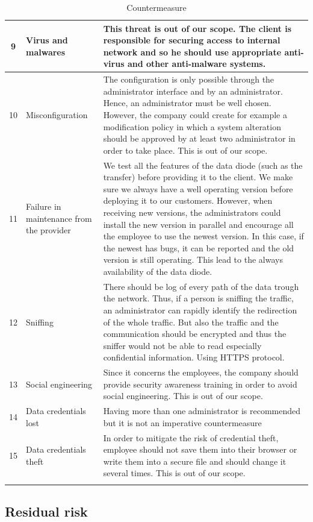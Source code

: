\documentclass[a4paper,10pt]{article}
\begin{document}
\begin{longtable}{|c|p{2.5cm}|p{12cm}|}
\hline
9 & Virus and malwares & This threat is out of our scope. The client is responsible for securing access to internal network and so he should use appropriate anti-virus and other anti-malware systems.  \\
\hline
10 & Misconfiguration & The configuration is only possible through the administrator interface and by an administrator. Hence, an administrator must be well chosen. However, the company could create for example a modification policy in which a system alteration should be approved by at least two administrator in order to take place. This is out of our scope.  \\
\hline
11 & Failure in maintenance from the provider & We test all the features of the data diode (such as the transfer) before providing it to the client. We make sure we always have a well operating version before deploying it to our customers. However, when receiving new versions, the administrators could install the new version in parallel and encourage all the employee to use the newest version. In this case, if the newest has bugs, it can be reported and the old version is still operating. This lead to the always availability of the data diode. \\
\hline
12 & Sniffing & There should be log of every path of the data trough the network. Thus, if a person is sniffing the traffic, an administrator can rapidly identify the redirection of the whole traffic. But also the traffic and the communication should be encrypted and thus the sniffer would not be able to read especially confidential information. Using HTTPS protocol. \\
\hline
13 & Social engineering & Since it concerns the employees, the company should provide security awareness training in order to avoid social engineering. This is out of our scope.  \\
\hline
14 & Data credentials lost & Having more than one administrator is recommended but it is not an imperative countermeasure \\
\hline
15 & Data credentials theft & In order to mitigate the risk of credential theft, employee should not save them into their browser or write them into a secure file and should change it several times. This is out of our scope.\\
\hline
\caption{Countermeasure}
\label{tab:contermesure}
\end{longtable}

\subsection{Residual risk}
\end{document}
